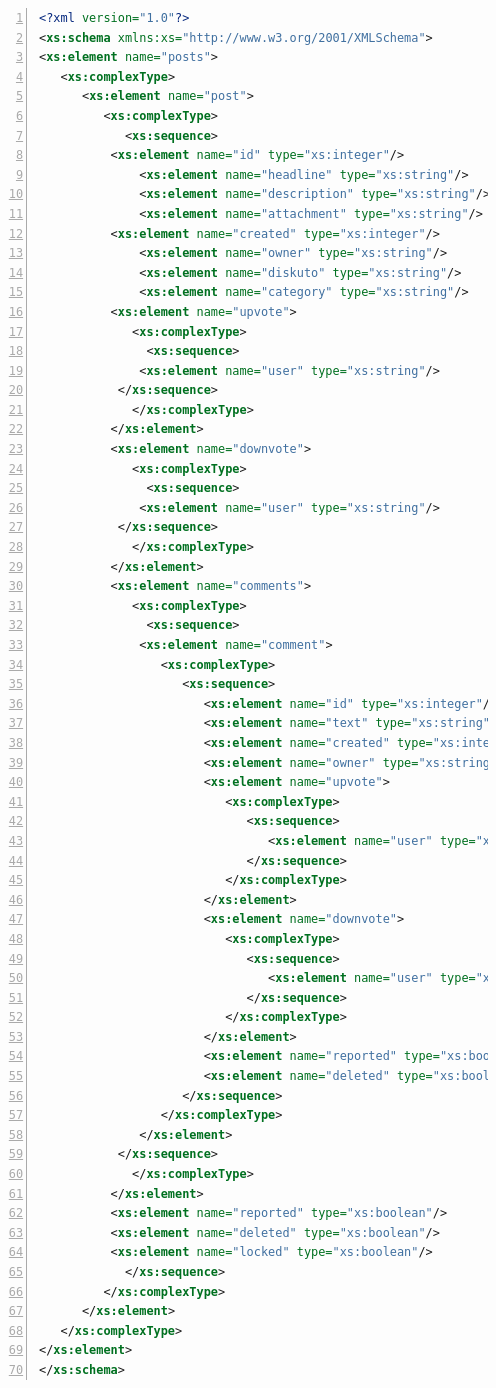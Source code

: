 \documentclass{foi}
\begin{document}
\begin{lstlisting}[language=XML, numbers=left, caption=XML Schema za dokument "posts.xml", captionpos=b]
 <?xml version="1.0"?>
<xs:schema xmlns:xs="http://www.w3.org/2001/XMLSchema">
<xs:element name="posts">
   <xs:complexType>
      <xs:element name="post">
         <xs:complexType>
            <xs:sequence>
	      <xs:element name="id" type="xs:integer"/>
              <xs:element name="headline" type="xs:string"/>
              <xs:element name="description" type="xs:string"/>
              <xs:element name="attachment" type="xs:string"/>
	      <xs:element name="created" type="xs:integer"/>
              <xs:element name="owner" type="xs:string"/>
              <xs:element name="diskuto" type="xs:string"/>
              <xs:element name="category" type="xs:string"/>
	      <xs:element name="upvote">
	         <xs:complexType>
	           <xs:sequence>
		      <xs:element name="user" type="xs:string"/>
		   </xs:sequence>
	         </xs:complexType>
	      </xs:element>
	      <xs:element name="downvote">
	         <xs:complexType>
	           <xs:sequence>
		      <xs:element name="user" type="xs:string"/>
		   </xs:sequence>
	         </xs:complexType>
	      </xs:element>
	      <xs:element name="comments">
	         <xs:complexType>
	           <xs:sequence>
		      <xs:element name="comment">
		         <xs:complexType>
		            <xs:sequence>
		               <xs:element name="id" type="xs:integer"/>
		               <xs:element name="text" type="xs:string"/>
		               <xs:element name="created" type="xs:integer"/>
		               <xs:element name="owner" type="xs:string"/>
		               <xs:element name="upvote">
		                  <xs:complexType>
		                     <xs:sequence>
		                        <xs:element name="user" type="xs:string"/>
		                     </xs:sequence>
		                  </xs:complexType>
		               </xs:element>
		               <xs:element name="downvote">
		                  <xs:complexType>
		                     <xs:sequence>
		                        <xs:element name="user" type="xs:string"/>
		                     </xs:sequence>
		                  </xs:complexType>
		               </xs:element>
		               <xs:element name="reported" type="xs:boolean"/>
		               <xs:element name="deleted" type="xs:boolean"/>
		            </xs:sequence>
		         </xs:complexType>
		      </xs:element>
		   </xs:sequence>
	         </xs:complexType>
	      </xs:element>
	      <xs:element name="reported" type="xs:boolean"/>
	      <xs:element name="deleted" type="xs:boolean"/>
	      <xs:element name="locked" type="xs:boolean"/>
            </xs:sequence>
         </xs:complexType>
      </xs:element>
   </xs:complexType>
</xs:element>
</xs:schema> 
\end{lstlisting}
\end{document}
